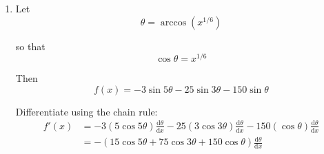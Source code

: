 \documentclass[leqno]{article}
\begin{document}
\begin{enumerate}[
  label=\textbf{\arabic*.},
  leftmargin=*,
  topsep=0pt,
  partopsep=0pt,
  parsep=0pt
]
\begin{djsSolution}
\begin{enumerate}[label=\textbf{(\alph*)}]
  so equating real parts gives
  \begin{align*}
  \cos 3\theta
  &=\cos^3\theta-3\cos\theta\sin^2\theta \\
  &=\cos^3\theta-3\cos\theta(1-\cos^2\theta) \\
  &=4\cos^3\theta-3\cos\theta
  \end{align*}

  Now use
  \[
  \cos^5\theta\equiv A\cos 5\theta+B\cos 3\theta+C\cos\theta
  \]

  Substituting the expansions:
  \begin{align*}
  \cos^5\theta
  &\equiv A(16\cos^5\theta-20\cos^3\theta+5\cos\theta)+B(4\cos^3\theta-3\cos\theta)+C\cos\theta \\
  &\equiv 16A\cos^5\theta+(-20A+4B)\cos^3\theta+(5A-3B+C)\cos\theta
  \end{align*}

  Equating coefficients of powers of \(\cos\theta\):
  \begin{align*}
  16A&=1 \\
  -20A+4B&=0 \\
  5A-3B+C&=0
  \end{align*}

  So
  \begin{align*}
  A&=\frac1{16} \\
  -20\left(\frac1{16}\right)+4B&=0\quad\Longrightarrow\quad 4B=\frac54\quad\Longrightarrow\quad B=\frac5{16} \\
  5\left(\frac1{16}\right)-3\left(\frac5{16}\right)+C&=0\quad\Longrightarrow\quad -\frac{10}{16}+C=0\quad\Longrightarrow\quad C=\frac{10}{16}=\frac58
  \end{align*}

  Hence
  \[
  A=\frac1{16},\qquad B=\frac5{16},\qquad C=\frac58
  \]

  \item Let
  \[
  \theta=\arccos\left(x^{1/6}\right)
  \]

  so that
  \[
  \cos\theta=x^{1/6}
  \]

  Then
  \[
  f(x)=-3\sin 5\theta-25\sin 3\theta-150\sin\theta
  \]

  Differentiate using the chain rule:
  \begin{align*}
  f'(x)
  &=-3(5\cos 5\theta)\frac{\mathrm{d}\theta}{\mathrm{d}x}
    -25(3\cos 3\theta)\frac{\mathrm{d}\theta}{\mathrm{d}x}
    -150(\cos\theta)\frac{\mathrm{d}\theta}{\mathrm{d}x} \\
  &=-(15\cos 5\theta+75\cos 3\theta+150\cos\theta)\frac{\mathrm{d}\theta}{\mathrm{d}x}
  \end{align*}


\end{enumerate}
\end{djsSolution}
\end{enumerate}
\end{document}
